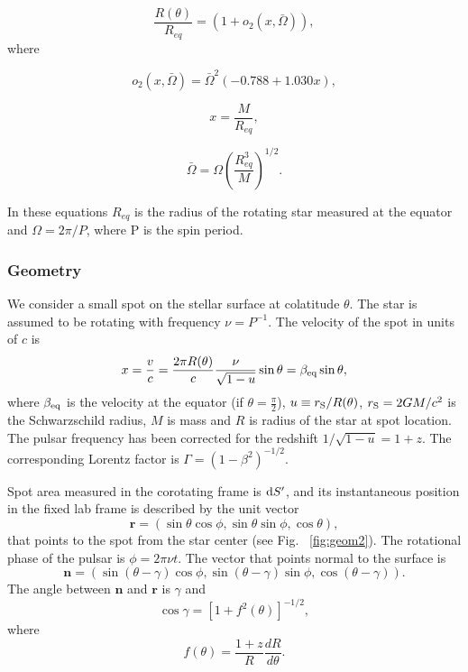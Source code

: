 \documentclass{wihuri}
\def\rg{r_{\rm S}} %
\def\d{{\rm d}}
\def\rg{r_{\rm S}} %
\newcommand{\bmath}[1]{\boldsymbol{#1}}
\begin{document}
\begin{equation}
\label{rtheta2}
\frac{R(\theta)}{R_{eq}} = (1 + o_{2}(x,\bar{\Omega})),
\end{equation}
where


\begin{equation}
\label{otwo}
o_{2}(x,\bar{\Omega}) = \bar{\Omega}^{2}(-0.788+1.030x),
\end{equation}


\begin{equation}
\label{rtheta2x}
x = \frac{M}{R_{eq}},
\end{equation}


\begin{equation}
\label{rtheta2omega}
\bar{\Omega} = \Omega (\frac{R_{eq}^{3}}{M})^{1/2}.
\end{equation}


In these equations $R_{eq}$ is the radius of the rotating star measured at the equator and $\Omega = 2\pi/P$, where P is the spin period.


\subsubsection{Geometry}

We consider a small spot on the stellar surface at colatitude $\theta$. 
The star is assumed to be rotating  with frequency $\nu=P^{-1}$.
The velocity of the spot in units of $c$ is 
\begin{equation}
\label{beta2}
x = \frac{v}{c}=\frac{2\pi R(\theta)}{c} \frac{\nu}{\sqrt{1-u}} \sin\theta =\beta_{\rm eq} \sin\theta,
\end{equation}
where $\beta_{\rm eq}$ is the velocity at the equator (if $\theta = \frac{\pi}{2}$), $u\equiv\rg/R(\theta)$, 
$\rg=2GM/c^2$ is the Schwarzschild radius, $M$ is mass and $R$ is
radius of the star at spot location. The pulsar frequency has been corrected for the redshift $1/\sqrt{1-u}=1+z$.
The corresponding Lorentz factor is $\Gamma=(1-\beta^2)^{-1/2}$.



Spot area measured in the corotating frame is $\d S^\prime$, and its instantaneous position in
the fixed lab frame is described by the unit vector 
\begin{equation}
\bmath{r}=(\sin\theta\cos\phi, \sin\theta\sin\phi, \cos\theta),
\end{equation}
that points to the spot from the star center (see Fig. ~\ref{fig:geom2}). The rotational phase of the pulsar is $\phi=2\pi\nu t$. The vector that points normal to the surface is
\begin{equation}
\bmath{n}=(\sin(\theta-\gamma)\cos\phi, \sin(\theta-\gamma)\sin\phi, \cos(\theta-\gamma)).
\end{equation}
The angle between $\bmath{n}$ and $\bmath{r}$ is $\gamma$ and 
\begin{equation}
\cos\gamma=[1+f^{2}(\theta)]^{-1/2},
\end{equation}
where
\begin{equation}
f(\theta)=\frac{1+z}{R}\frac{dR}{d\theta}.
\end{equation}
\end{document}
